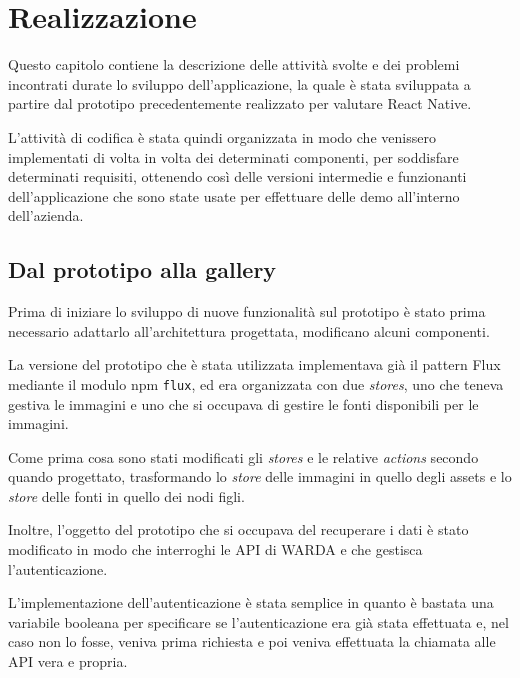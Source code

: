 
\chapter{Realizzazione}
\label{cap:realizzazione}

Questo capitolo contiene la descrizione delle attività svolte e dei problemi incontrati durate lo sviluppo dell'applicazione, la quale è stata sviluppata a partire dal prototipo precedentemente realizzato per valutare React Native.

L'attività di codifica è stata quindi organizzata in modo che venissero implementati di volta in volta dei determinati componenti, per soddisfare determinati requisiti, ottenendo così delle versioni intermedie e funzionanti dell'applicazione che sono state usate per effettuare delle demo all'interno dell'azienda.

\section{Dal prototipo alla gallery}

Prima di iniziare lo sviluppo di nuove funzionalità sul prototipo è stato prima necessario adattarlo all'architettura progettata, modificano alcuni componenti.

La versione del prototipo che è stata utilizzata implementava già il pattern Flux mediante il modulo npm \texttt{flux}, ed era organizzata con due \textit{stores}, uno che teneva gestiva le immagini e uno che si occupava di gestire le fonti disponibili per le immagini.

Come prima cosa sono stati modificati gli \textit{stores} e le relative \textit{actions} secondo quando progettato, trasformando lo \textit{store} delle immagini in quello degli assets e lo \textit{store} delle fonti in quello dei nodi figli.

Inoltre, l'oggetto del prototipo che si occupava del recuperare i dati è stato modificato in modo che interroghi le API di WARDA e che gestisca l'autenticazione.

L'implementazione dell'autenticazione è stata semplice in quanto è bastata una variabile booleana per specificare se l'autenticazione era già stata effettuata e, nel caso non lo fosse, veniva prima richiesta e poi veniva effettuata la chiamata alle API vera e propria.


